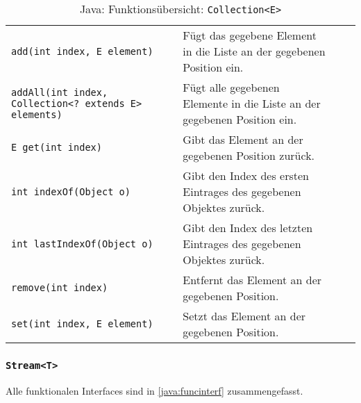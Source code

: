 \begin{sidewaystable}
\begin{tabular}{l | p{8cm} | c | c}
		\texttt{add(int index, E element)}                           & Fügt das gegebene Element in die Liste an der gegebenen Position ein.    & \texttimes &            \\
		\texttt{addAll(int index, Collection<? extends E> elements)} & Fügt alle gegebenen Elemente in die Liste an der gegebenen Position ein. & \texttimes &            \\
		\texttt{E get(int index)}                                    & Gibt das Element an der gegebenen Position zurück.                       & \texttimes &            \\
		\texttt{int indexOf(Object o)}                               & Gibt den Index des ersten Eintrages des gegebenen Objektes zurück.       & \texttimes &            \\
		\texttt{int lastIndexOf(Object o)}                           & Gibt den Index des letzten Eintrages des gegebenen Objektes zurück.      & \texttimes &            \\
		\texttt{remove(int index)}                                   & Entfernt das Element an der gegebenen Position.                          & \texttimes &            \\
		\texttt{set(int index, E element)}                           & Setzt das Element an der gegebenen Position.                             & \texttimes &            \\
	\end{tabular}
	\caption{Java: Funktionsübersicht: \texttt{Collection<E>}}
\end{sidewaystable}


\subsubsection{\texttt{Stream<T>}}
Alle funktionalen Interfaces sind in \ref{java:funcinterf} zusammengefasst.

